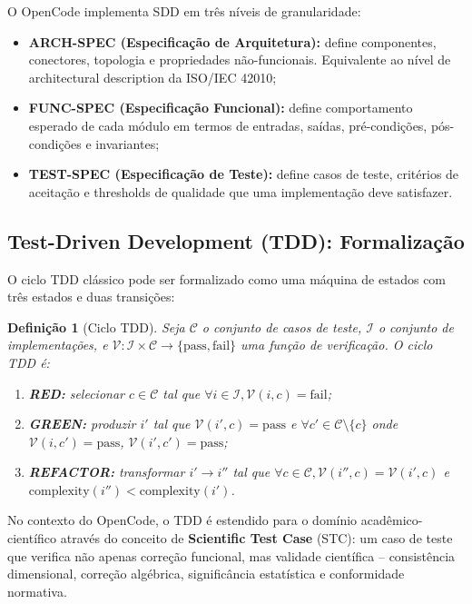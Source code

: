 \documentclass[12pt,a4paper,sumario=tradicional]{abntex2}
\newtheorem{definition}{Definição}[chapter]
\begin{document}
O OpenCode implementa SDD em três níveis de granularidade:

\begin{itemize}
    \item \textbf{ARCH-SPEC (Especificação de Arquitetura):} define componentes, conectores, topologia e propriedades não-funcionais. Equivalente ao nível de architectural description da ISO/IEC 42010;
    \item \textbf{FUNC-SPEC (Especificação Funcional):} define comportamento esperado de cada módulo em termos de entradas, saídas, pré-condições, pós-condições e invariantes;
    \item \textbf{TEST-SPEC (Especificação de Teste):} define casos de teste, critérios de aceitação e thresholds de qualidade que uma implementação deve satisfazer.
\end{itemize}

\subsection{Test-Driven Development (TDD): Formalização}

O ciclo TDD clássico \cite{beck2003tdd} pode ser formalizado como uma máquina de estados com três estados e duas transições:

\begin{definition}[Ciclo TDD]
Seja $\mathcal{C}$ o conjunto de casos de teste, $\mathcal{I}$ o conjunto de implementações, e $\mathcal{V}: \mathcal{I} \times \mathcal{C} \rightarrow \{\text{pass}, \text{fail}\}$ uma função de verificação. O ciclo TDD é:
\begin{enumerate}
    \item \textbf{RED:} selecionar $c \in \mathcal{C}$ tal que $\forall i \in \mathcal{I}, \mathcal{V}(i, c) = \text{fail}$;
    \item \textbf{GREEN:} produzir $i'$ tal que $\mathcal{V}(i', c) = \text{pass}$ e $\forall c' \in \mathcal{C} \setminus \{c\}$ onde $\mathcal{V}(i, c') = \text{pass}$, $\mathcal{V}(i', c') = \text{pass}$;
    \item \textbf{REFACTOR:} transformar $i' \rightarrow i''$ tal que $\forall c \in \mathcal{C}, \mathcal{V}(i'', c) = \mathcal{V}(i', c)$ e $\text{complexity}(i'') < \text{complexity}(i')$.
\end{enumerate}
\end{definition}

No contexto do OpenCode, o TDD é estendido para o domínio acadêmico-científico através do conceito de \textbf{Scientific Test Case} (STC): um caso de teste que verifica não apenas correção funcional, mas validade científica -- consistência dimensional, correção algébrica, significância estatística e conformidade normativa.
\end{document}
